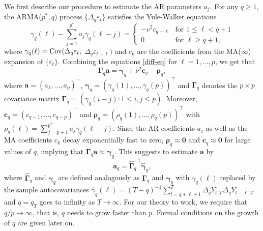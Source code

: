We first describe our procedure to estimate the AR parameters $a_j$. For any $q \ge 1$, the ARMA($p^*,q$) process $\{ \Delta_q \varepsilon_t \}$ satisfies the Yule-Walker equations
\begin{equation}\label{diff-eq}
\gamma_q(\ell) - \sum\limits_{j=1}^{p^*} a_j \gamma_q(\ell-j) = 
\begin{cases}
-\nu^2 c_{q-\ell} & \text{for } 1 \le \ell < q+1 \\
0  & \text{for } \ell \ge q+1,  
\end{cases}
\end{equation}
where $\gamma_q(\ell) = \textnormal{Cov}(\Delta_q \varepsilon_t,$ $\Delta_q \varepsilon_{t-\ell})$ and $c_k$ are the coefficients from the MA($\infty$) expansion of $\{ \varepsilon_t \}$. Combining the equations \eqref{diff-eq} for $\ell = 1,\ldots,p$, we get that 
\begin{equation}\label{YW-eq} 
\boldsymbol{\Gamma}_q \boldsymbol{a} = \boldsymbol{\gamma}_q + \nu^2 \boldsymbol{c}_q - \boldsymbol{\rho}_q,  
\end{equation} 
where $\boldsymbol{a} = (a_1,\ldots,a_p)^\top$, $\boldsymbol{\gamma}_q = (\gamma_q(1),\dots,\gamma_q(p))^\top$ and $\boldsymbol{\Gamma}_q$ denotes the $p \times p$ covariance matrix $\boldsymbol{\Gamma}_q = (\gamma_q(i-j): 1 \le i,j \le p)$. Moreover, $\boldsymbol{c}_q = (c_{q-1},\dots,c_{q-p})^\top$ and $\boldsymbol{\rho}_q = (\rho_q(1),\ldots,\rho_q(p))^\top$ with $\rho_q(\ell) = \sum_{j=p+1}^{p^*} a_j \gamma_q(\ell-j)$. Since the AR coefficients $a_j$ as well as the MA coefficients $c_k$ decay exponentially fast to zero, $\boldsymbol{\rho}_q \approx \boldsymbol{0}$ and $\boldsymbol{c}_q \approx \boldsymbol{0}$ for large values of $q$, implying that $\boldsymbol{\Gamma}_q \boldsymbol{a} \approx \boldsymbol{\gamma}_q$. This suggests to estimate $\boldsymbol{a}$ by 
\begin{equation}\label{est-AR-FS}
\widetilde{\boldsymbol{a}}_q = \widehat{\boldsymbol{\Gamma}}_q^{-1} \widehat{\boldsymbol{\gamma}}_q, 
\end{equation}
where $\widehat{\boldsymbol{\Gamma}}_q$ and $\widehat{\boldsymbol{\gamma}}_q$ are defined analogously as $\boldsymbol{\Gamma}_q$ and $\boldsymbol{\gamma}_q$ with $\gamma_q(\ell)$ replaced by the sample autocovariances $\widehat{\gamma}_q(\ell) = (T-q)^{-1} \sum_{t=q+\ell+1}^T \Delta_q Y_{t,T} \Delta_q Y_{t-\ell,T}$ and $q = q_T$ goes to infinity as $T \rightarrow \infty$. For our theory to work, we require that $q/p \rightarrow \infty$, that is, $q$ needs to grow faster than $p$. Formal conditions on the growth of $q$ are given later on. 


